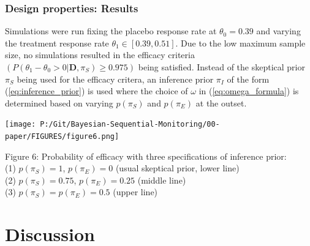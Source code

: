 \documentclass[12pt]{article}
\begin{document}


\subsubsection{Design properties: Results}
%
%

Simulations were run fixing the placebo response rate at $\theta_0=0.39$ and varying the treatment response rate $\theta_1\in[0.39,0.51]$. Due to the low maximum sample size, no simulations resulted in the efficacy criteria $(P(\theta_1-\theta_0>0|\mathbf{D},\pi_S)\geq 0.975)$ being satisfied. Instead of the skeptical prior $\pi_S$ being used for the efficacy critera, an inference prior $\pi_I$ of the form (\ref{eq:inference_prior}) is used where the choice of $\omega$ in (\ref{eq:omega_formula}) is determined based on varying $p(\pi_S)$ and $p(\pi_E)$ at the outset.
\begin{center}
\texttt{[image: P:/Git/Bayesian-Sequential-Monitoring/00-paper/FIGURES/figure6.png]}

Figure 6: Probability of efficacy with three specifications of inference prior:\\
(1) $p(\pi_S)=1$, $p(\pi_E)=0$ (usual skeptical prior, lower line)\\
(2) $p(\pi_S)=0.75$, $p(\pi_E)=0.25$ (middle line)\\
(3) $p(\pi_S)=p(\pi_E)=0.5$ (upper line)
\end{center}
\section{Discussion}
%
\end{document}
